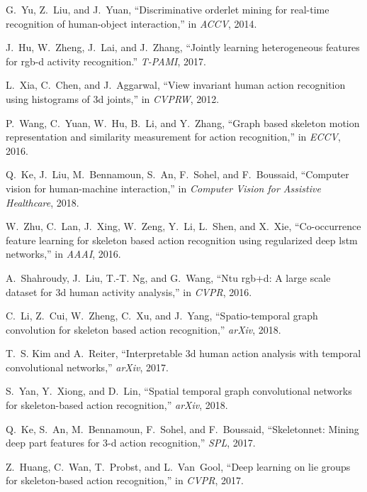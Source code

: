 \documentclass[10pt,twocolumn,letterpaper]{article}
\begin{document}
\begin{thebibliography}{10}
   G.~Yu, Z.~Liu, and J.~Yuan, ``Discriminative orderlet mining for real-time
     recognition of human-object interaction,'' in \emph{ACCV}, 2014.
   
   J.~Hu, W.~Zheng, J.~Lai, and J.~Zhang, ``Jointly learning heterogeneous
     features for rgb-d activity recognition.'' \emph{T-PAMI}, 2017.
   
   L.~Xia, C.~Chen, and J.~Aggarwal, ``View invariant human action recognition
     using histograms of 3d joints,'' in \emph{CVPRW}, 2012.
   
   P.~Wang, C.~Yuan, W.~Hu, B.~Li, and Y.~Zhang, ``Graph based skeleton motion
     representation and similarity measurement for action recognition,'' in
     \emph{ECCV}, 2016.
   
   Q.~Ke, J.~Liu, M.~Bennamoun, S.~An, F.~Sohel, and F.~Boussaid, ``Computer
     vision for human-machine interaction,'' in \emph{Computer Vision for
     Assistive Healthcare}, 2018.
   
   W.~Zhu, C.~Lan, J.~Xing, W.~Zeng, Y.~Li, L.~Shen, and X.~Xie, ``Co-occurrence
     feature learning for skeleton based action recognition using regularized deep
     lstm networks,'' in \emph{AAAI}, 2016.
   
   A.~Shahroudy, J.~Liu, T.-T. Ng, and G.~Wang, ``Ntu rgb+d: A large scale dataset
     for 3d human activity analysis,'' in \emph{CVPR}, 2016.
   
   C.~Li, Z.~Cui, W.~Zheng, C.~Xu, and J.~Yang, ``Spatio-temporal graph
     convolution for skeleton based action recognition,'' \emph{arXiv}, 2018.
   
   T.~S. Kim and A.~Reiter, ``Interpretable 3d human action analysis with temporal
     convolutional networks,'' \emph{arXiv}, 2017.
   
   S.~Yan, Y.~Xiong, and D.~Lin, ``Spatial temporal graph convolutional networks
     for skeleton-based action recognition,'' \emph{arXiv}, 2018.
   
   Q.~Ke, S.~An, M.~Bennamoun, F.~Sohel, and F.~Boussaid, ``Skeletonnet: Mining
     deep part features for 3-d action recognition,'' \emph{SPL}, 2017.
   
   Z.~Huang, C.~Wan, T.~Probst, and L.~Van~Gool, ``Deep learning on lie groups for
     skeleton-based action recognition,'' in \emph{CVPR}, 2017.
   

\end{thebibliography}
\end{document}
